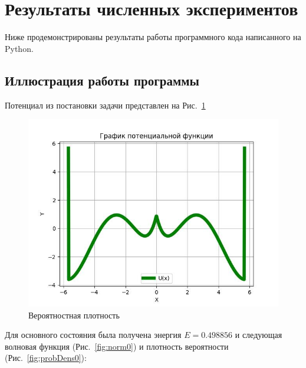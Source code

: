 \documentclass[a4paper,12pt]{article}
\begin{document}
\newpage

\section{Результаты численных экспериментов}\label{sec:results}

Ниже продемонстрированы результаты работы программного кода написанного на Python.

\subsection{Иллюстрация работы программы}\label{subsec:results_images}

Потенциал из постановки задачи представлен на Рис.~\ref{fig:pot_func}

\begin{figure}[h]
\centering
    \includegraphics[width=0.45\linewidth]{Potential_func_graph}
    \caption{Вероятностная плотность}\label{fig:pot_func}
\end{figure}

Для основного состояния была получена энергия $E = 0.498856$ и следующая волновая функция (Рис.~\ref{fig:norm0}) и плотность вероятности (Рис.~\ref{fig:probDens0}):
\end{document}
